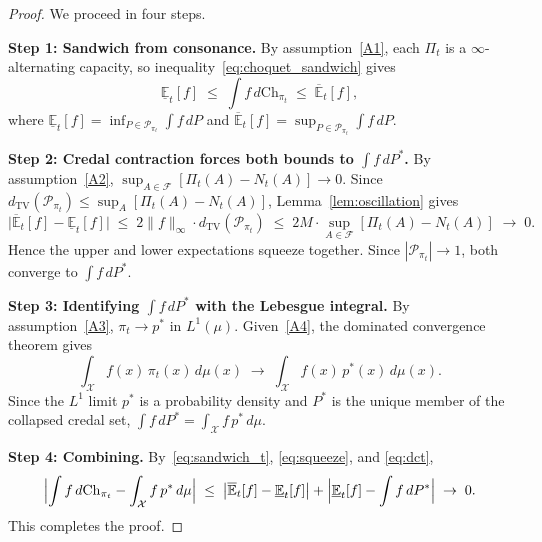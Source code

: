 \documentclass[10pt,a4paper]{amsart}
\newcommand{\E}{\mathbb{E}}
\newcommand{\Lone}{L^1}
\newcommand{\calF}{\mathcal{F}}
\newcommand{\calX}{\mathcal{X}}
\begin{document}
\begin{proof}
We proceed in four steps.

\smallskip\noindent
\textbf{Step 1: Sandwich from consonance.}
By assumption~\eqref{A1}, each $\Pi_t$ is a $\infty$-alternating capacity,
so inequality~\eqref{eq:choquet_sandwich} gives
\begin{equation}
\underline{\E}_t[f]
\;\le\;
\int f\,d\mathrm{Ch}_{\pi_t}
\;\le\;
\overline{\E}_t[f],
\label{eq:sandwich_t}
\end{equation}
where $\underline{\E}_t[f]=\inf_{P\in\mathcal{P}_{\pi_t}}\int f\,dP$ and
$\overline{\E}_t[f]=\sup_{P\in\mathcal{P}_{\pi_t}}\int f\,dP$.

\smallskip\noindent
\textbf{Step 2: Credal contraction forces both bounds to $\int f\,dP^*$.}
By assumption~\eqref{A2}, $\sup_{A\in\calF}[\Pi_t(A)-N_t(A)]\to 0$.
Since $d_{\mathrm{TV}}(\mathcal{P}_{\pi_t})\le\sup_A[\Pi_t(A)-N_t(A)]$,
Lemma~\ref{lem:oscillation} gives
\begin{equation}
\bigl|\overline{\E}_t[f]-\underline{\E}_t[f]\bigr|
\;\le\; 2\|f\|_\infty\cdot d_{\mathrm{TV}}(\mathcal{P}_{\pi_t})
\;\le\; 2M\cdot\sup_{A\in\calF}[\Pi_t(A)-N_t(A)]
\;\to\; 0.
\label{eq:squeeze}
\end{equation}
Hence the upper and lower expectations squeeze together.
Since $|\mathcal{P}_{\pi_t}|\to 1$, both converge to $\int f\,dP^*$.

\smallskip\noindent
\textbf{Step 3: Identifying $\int f\,dP^*$ with the Lebesgue integral.}
By assumption~\eqref{A3}, $\pi_t\to p^*$ in $\Lone(\mu)$.
Given~\eqref{A4}, the dominated convergence theorem gives
\begin{equation}
\int_\calX f(x)\,\pi_t(x)\,d\mu(x)
\;\to\;
\int_\calX f(x)\,p^*(x)\,d\mu(x).
\label{eq:dct}
\end{equation}
Since the $\Lone$ limit $p^*$ is a probability density and $P^*$ is the unique
member of the collapsed credal set, $\int f\,dP^*=\int_\calX f\,p^*\,d\mu$.

\smallskip\noindent
\textbf{Step 4: Combining.}
By~\eqref{eq:sandwich_t}, \eqref{eq:squeeze}, and \eqref{eq:dct},
\[
\Bigl|\int f\,d\mathrm{Ch}_{\pi_t}
  - \int_\calX f\,p^*\,d\mu\Bigr|
\;\le\;
\bigl|\overline{\E}_t[f]-\underline{\E}_t[f]\bigr|
+ \Bigl|\underline{\E}_t[f] - \int f\,dP^*\Bigr|
\;\to\; 0.
\]
This completes the proof.
\end{proof}
\end{document}
